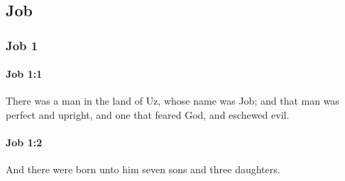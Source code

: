 \subsection{Job}
	\label{JOB}

	\subsubsection{Job 1} %
		\label{JOB-1}

		\paragraph{Job 1:1} %
			\label{JOB-1-1}

			There was a man in the land of Uz, whose name was Job; and that man was perfect and upright, and one that feared God, and eschewed evil.


		\paragraph{Job 1:2} %
			\label{JOB-1-2}

			And there were born unto him seven sons and three daughters.

